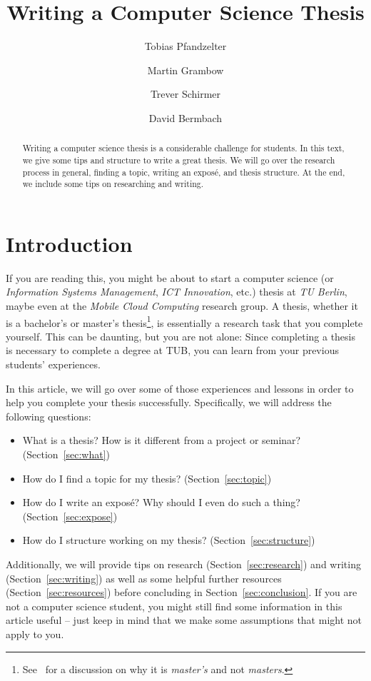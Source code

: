 \documentclass[a4paper]{article}
\title{Writing a Computer Science Thesis}
\author{Tobias Pfandzelter}
\author{Martin Grambow}
\author{Trever Schirmer}
\author{David Bermbach}
\affil{Mobile Cloud Computing Research Group\\TU Berlin \& Einstein Center Digital Future\\Berlin, Germany\\\texttt{\{tp,mg,ts,db\}@mcc.tu-berlin.de}}
\begin{document}
\maketitle
\begin{abstract}
    Writing a computer science thesis is a considerable challenge for students.
    In this text, we give some tips and structure to write a great thesis.
    We will go over the research process in general, finding a topic, writing an expos\'e, and thesis structure.
    At the end, we include some tips on researching and writing.
\end{abstract}

\section{Introduction}
\label{sec:introduction}

If you are reading this, you might be about to start a computer science (or \emph{Information Systems Management}, \emph{ICT Innovation}, etc.) thesis at \emph{TU Berlin}, maybe even at the \emph{Mobile Cloud Computing} research group.
A thesis, whether it is a bachelor's or master's thesis\footnote{See~\cite{masters-apostrophe-as} for a discussion on why it is \emph{master's} and not \emph{masters}.}, is essentially a research task that you complete yourself.
This can be daunting, but you are not alone: Since completing a thesis is necessary to complete a degree at TUB, you can learn from your previous students' experiences.

In this article, we will go over some of those experiences and lessons in order to help you complete your thesis successfully.
Specifically, we will address the following questions:

\begin{itemize}
    \item What is a thesis? How is it different from a project or seminar? (Section~\ref{sec:what})
    \item How do I find a topic for my thesis? (Section~\ref{sec:topic})
    \item How do I write an expos\'e? Why should I even do such a thing? (Section~\ref{sec:expose})
    \item How do I structure working on my thesis? (Section~\ref{sec:structure})
\end{itemize}

Additionally, we will provide tips on research (Section~\ref{sec:research}) and writing (Section~\ref{sec:writing}) as well as some helpful further resources (Section~\ref{sec:resources}) before concluding in Section~\ref{sec:conclusion}.
If you are not a computer science student, you might still find some information in this article useful -- just keep in mind that we make some assumptions that might not apply to you.
\end{document}

